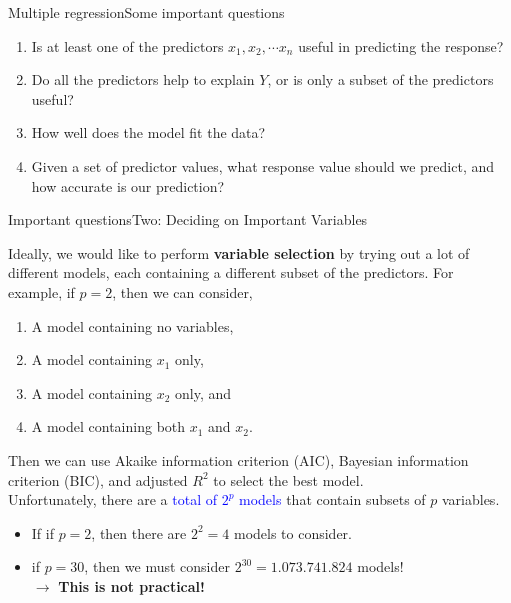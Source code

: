 \begin{frame}[noframenumbering]{Multiple regression}{Some important questions}

\begin{enumerate}
    \item<1> Is at least one of the predictors $x_1, x_2, \cdots x_n$ useful in predicting the response?  
    \item<1-2> Do all the predictors help to explain $Y$, or is only a subset of the predictors useful? 
    \item<1> How well does the model fit the data? 
    \item<1> Given a set of predictor values, what response value should we predict, and how accurate is our prediction?
    
\end{enumerate}
\end{frame}

\begin{frame}{Important questions}{Two: Deciding on Important Variables}

Ideally, we would like to perform \textbf{variable selection} by trying out a lot of diﬀerent models, each containing a diﬀerent subset of the predictors. \pause For example, if $p=2$, then we can consider, \pause

\begin{enumerate}
    \item A model containing no variables, \pause
    \item A model containing $x_1$ only, \pause
    \item A model containing $x_2$ only, and \pause
    \item A model containing both $x_1$ and $x_2$. \pause   
\end{enumerate}

Then we can use Akaike information criterion (AIC), Bayesian information criterion (BIC), and adjusted $R^2$ to select the best model. \pause \\

Unfortunately, there are a \textcolor{blue}{total of $2^p$ models} that contain subsets of $p$ variables. \pause  \\

\begin{itemize}
    \item If if $p = 2$, then there are $2^2 = 4$ models to consider. \pause
    \item if $p = 30$, then we must consider $2^{30} = 1.073.741.824$ models! \\ \pause $\rightarrow$ \textbf{This is not practical!}
\end{itemize}


\end{frame}


